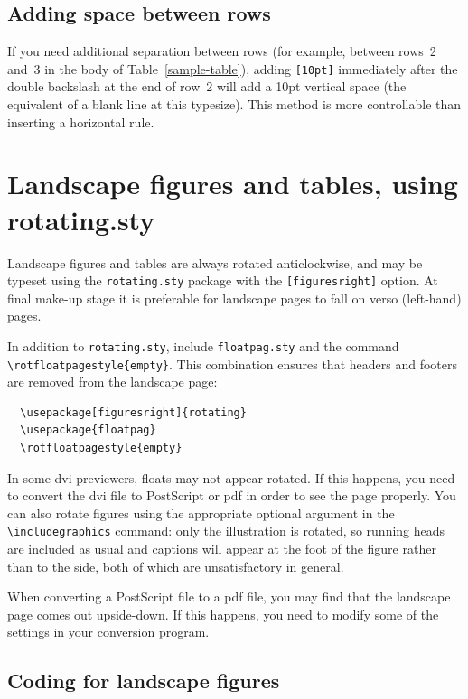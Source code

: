 \subsection{Adding space between rows}
If you need additional separation between rows (for example,
between rows~2 and~3 in the body of Table~\ref{sample-table}),
adding \verb"[10pt]" immediately after the double backslash at
the end of row~2 will add a 10pt vertical space (the equivalent of
a blank line at this typesize). This method is more controllable
than inserting a horizontal rule.

\section{Landscape figures and tables, using rotating.sty}
Landscape figures and tables are always rotated anticlockwise,
and may be typeset using the \verb"rotating.sty" package with
the \verb"[figuresright]" option. At final make-up stage it is preferable
for landscape pages to fall on verso (left-hand) pages.

In addition to \verb"rotating.sty", include \verb"floatpag.sty" and
the command \verb"\rotfloatpagestyle{empty}". This combination ensures
that headers and footers are removed from the landscape page:
\begin{verbatim}
  \usepackage[figuresright]{rotating}
  \usepackage{floatpag}
  \rotfloatpagestyle{empty}
\end{verbatim}
In some dvi previewers, floats may not appear rotated. If this happens,
you need to convert the dvi file to PostScript or pdf
in order to see the page properly. You can also rotate figures using
the appropriate optional argument in the \verb"\includegraphics" command:
only the illustration is rotated, so running heads are included as usual and captions will
appear at the foot of the figure rather than to the side, both of
which are unsatisfactory in general.

When converting a PostScript file to a pdf file, you may find that
the landscape page comes out upside-down. If this happens, you need
to modify some of the settings in your conversion program.

\subsection{Coding for landscape figures}

